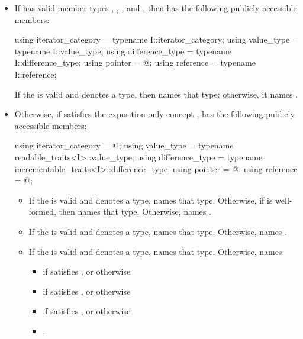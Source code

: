 \begin{itemize}
\item
If  has valid member
types , ,
, and ,
then
has the following publicly accessible members:
\begin{codeblock}
  using iterator_category = typename I::iterator_category;
  using value_type        = typename I::value_type;
  using difference_type   = typename I::difference_type;
  using pointer           = @\seebelow@;
  using reference         = typename I::reference;
\end{codeblock}
If the   is valid and
denotes a type, then  names that type;
otherwise, it names .

\item
Otherwise, if  satisfies the exposition-only concept
,
 has the following
publicly accessible members:
\begin{codeblock}
  using iterator_category = @\seebelow@;
  using value_type        = typename readable_traits<I>::value_type;
  using difference_type   = typename incrementable_traits<I>::difference_type;
  using pointer           = @\seebelow@;
  using reference         = @\seebelow@;
\end{codeblock}
\begin{itemize}
\item If the   is valid and denotes a type,
 names that type. Otherwise, if
 is well-formed, then
 names that type. Otherwise, 
names .

\item If the   is valid and denotes a
type,  names that type. Otherwise, 
names .

\item If the   is valid and
denotes a type,  names that type.
Otherwise,  names:
\begin{itemize}
\item
{}
if
 satisfies ,
or otherwise
\item
{} if
 satisfies ,
or otherwise
\item
{} if
 satisfies ,
or otherwise
\item
{}.
\end{itemize}
\end{itemize}


\end{itemize}
